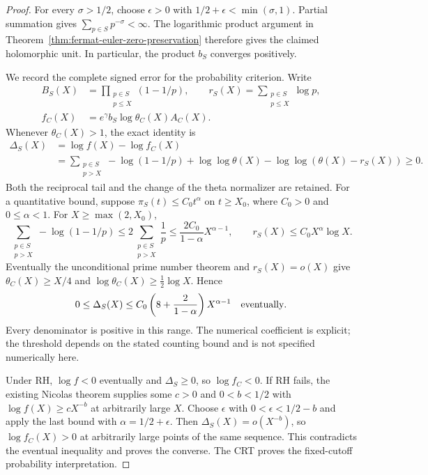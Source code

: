 \documentclass[11pt]{article}
\theoremstyle{definition}
\begin{document}
\begin{proof}
For every $\sigma>1/2$, choose $\epsilon>0$ with
$1/2+\epsilon<\min(\sigma,1)$. Partial summation gives
$\sum_{p\in S}p^{-\sigma}<\infty$. The logarithmic product
argument in Theorem~\ref{thm:fermat-euler-zero-preservation}
therefore gives the claimed holomorphic unit. In particular,
the product $b_S$ converges positively.

We record the complete signed error for the probability
criterion. Write
\begin{align*}
 B_S(X)&=\prod_{\substack{p\in S\\p\le X}}(1-1/p),\qquad
 r_S(X)=\sum_{\substack{p\in S\\p\le X}}\log p,\\
 f_C(X)&=e^\gamma b_S\log\theta_C(X)A_C(X).
\end{align*}
Whenever $\theta_C(X)>1$, the exact identity is
\begin{align*}
 \Delta_S(X)&=\log f(X)-\log f_C(X)\\
 &=\sum_{\substack{p\in S\\p>X}}-\log(1-1/p)
   +\log\log\theta(X)-\log\log(\theta(X)-r_S(X))\ge0.
\end{align*}
Both the reciprocal tail and the change of the theta normalizer
are retained. For a quantitative bound, suppose
$\pi_S(t)\le C_0t^\alpha$ on $t\ge X_0$, where
$C_0>0$ and $0\le\alpha<1$. For $X\ge\max(2,X_0)$,
\[
 \sum_{\substack{p\in S\\p>X}}-\log(1-1/p)
 \le2\sum_{\substack{p\in S\\p>X}}\frac1p
 \le\frac{2C_0}{1-\alpha}X^{\alpha-1},\qquad
 r_S(X)\le C_0X^\alpha\log X.
\]
Eventually the unconditional prime number theorem and
$r_S(X)=o(X)$ give $\theta_C(X)\ge X/4$ and
$\log\theta_C(X)\ge\tfrac12\log X$. Hence
\[
 0\le\Delta_S(X)
 \le C_0\left(8+\frac2{1-\alpha}\right)X^{\alpha-1}
 \quad\hbox{eventually}.
\]
Every denominator is positive in this range. The numerical
coefficient is explicit; the threshold depends on the stated
counting bound and is not specified numerically here.

Under RH, $\log f<0$ eventually and $\Delta_S\ge0$, so
$\log f_C<0$. If RH fails, the existing Nicolas theorem
supplies some $c>0$ and $0<b<1/2$ with
$\log f(X)\ge cX^{-b}$ at arbitrarily large $X$.
Choose $\epsilon$ with $0<\epsilon<1/2-b$ and apply the
last bound with $\alpha=1/2+\epsilon$. Then
$\Delta_S(X)=o(X^{-b})$, so $\log f_C(X)>0$ at arbitrarily
large points of the same sequence. This contradicts the
eventual inequality and proves the converse.
The CRT proves the fixed-cutoff probability interpretation.
\end{proof}
\end{document}
